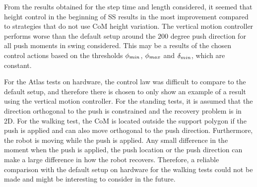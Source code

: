 From the results obtained for the step time and length considered, it seemed that height control in the beginning of \ac{SS} results in the most improvement compared to strategies that do not use \ac{CoM} height variation. The vertical motion controller performs worse than the default setup around the $200$ degree push direction for all push moments in swing considered. This may be a results of the chosen control actions based on the thresholds $\phi_{min}$, $\phi_{max}$ and $\delta_{min}$, which are constant.

For the Atlas tests on hardware, the control law was difficult to compare to the default setup, and therefore there is chosen to only show an example of a result using the vertical motion controller. For the standing tests, it is assumed that the direction orthogonal to the push is constrained and the recovery problem is in \ac{2D}. For the walking test, the \ac{CoM} is located outside the support polygon if the push is applied and can also move orthogonal to the push direction. Furthermore, the robot is moving while the push is applied. Any small difference in the moment when the push is applied, the push location or the push direction can make a large difference in how the robot recovers. Therefore, a reliable comparison with the default setup on hardware for the walking tests could not be made and might be interesting to consider in the future. 
